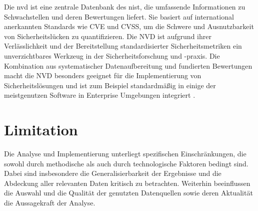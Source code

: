 \par Die \gls{nvd} ist eine zentrale Datenbank des \gls{nist}, die umfassende Informationen zu Schwachstellen und deren Bewertungen liefert. Sie basiert auf international anerkannten Standards wie CVE und CVSS, um die Schwere und Ausnutzbarkeit von Sicherheitslücken zu quantifizieren. Die NVD ist aufgrund ihrer Verlässlichkeit  und der Bereitstellung standardisierter Sicherheitsmetriken ein unverzichtbares Werkzeug in der Sicherheitsforschung und -praxis. Die Kombination aus systematischer Datenaufbereitung und fundierten Bewertungen macht die NVD besonders geeignet für die Implementierung von Sicherheitslösungen und ist zum Beispiel standardmäßig in einige der meistgenutzen Software in Enterprise Umgebungen integriert \autocite{AssetsNVDIntegration} \autocite{InformationenNVDIntegrationen}.

\section{Limitation}
\label{sec:limitationen}
Die Analyse und Implementierung unterliegt spezifischen Einschränkungen, die sowohl durch methodische als auch durch technologische Faktoren bedingt sind. Dabei sind insbesondere die Generalisierbarkeit der Ergebnisse und die Abdeckung aller relevanten Daten kritisch zu betrachten.  Weiterhin beeinflussen die Auswahl und die Qualität der genutzten Datenquellen sowie deren Aktualität die Aussagekraft der Analyse. 
